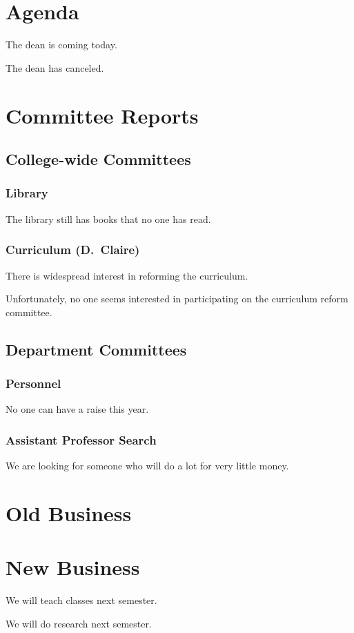 \documentclass[12pt]{meetingmins}
\begin{document}
\maketitle

\section{Agenda}
\begin{hiddenitems}
\item The dean is coming today.
\item The dean has canceled.
\end{hiddenitems}


\section{Committee Reports}

\subsection{College-wide Committees}
\subsubsection{Library}
The library still has books that no one has read.

\subsubsection{Curriculum {\rm (D.~Claire)}}
\begin{hiddensubitems}
\item
There is widespread interest in reforming the curriculum.

\item
Unfortunately, no one seems interested in participating on the
curriculum reform committee.
\end{hiddensubitems}

\subsection{Department Committees}
\subsubsection{Personnel}
No one can have a raise this year.

\subsubsection{Assistant Professor Search}
We are looking for someone who will do a lot for very little money.

\section{Old Business}
\begin{items}
\item
\priormins
\end{items}

\section{New Business}
\begin{items}
\item
We will teach classes next semester.

\item
We will do research next semester.
\end{items}
\end{document}
